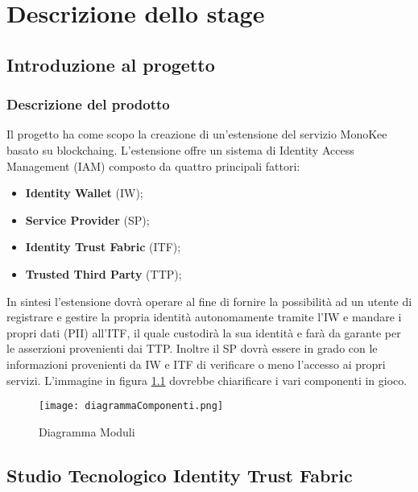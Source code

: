 
\chapter{Descrizione dello stage}
\label{cap:descrizione-stage}



\section{Introduzione al progetto}
\subsection{Descrizione del prodotto}
Il progetto ha come scopo la creazione di un’estensione del servizio MonoKee basato su \gls{blockchaing}. L’estensione offre un sistema di Identity Access Management (IAM) composto da quattro principali fattori:
    \begin{itemize}
        \item \textbf{Identity Wallet} (IW);
        \item \textbf{Service Provider} (SP);
        \item \textbf{Identity Trust Fabric} (ITF);
        \item \textbf{Trusted Third Party} (TTP);
    \end{itemize} 
In sintesi l’estensione dovrà operare al fine di fornire la possibilità ad un utente di registrare e gestire la propria identità autonomamente tramite l’IW e mandare i propri dati (PII) all’ITF, il quale custodirà la sua identità e farà da garante per le asserzioni provenienti dai TTP. Inoltre il SP dovrà essere in grado con le informazioni provenienti da IW e ITF di verificare o meno l’accesso ai propri servizi.
L'immagine in figura \ref{fig:diag-mod} dovrebbe chiarificare i vari componenti in gioco.
\begin{figure}[!h]
    \centering
    \texttt{[image: diagrammaComponenti.png]} 
    \caption{Diagramma Moduli}
    \label{fig:diag-mod} 
\end{figure}
\section{Studio Tecnologico Identity Trust Fabric}

